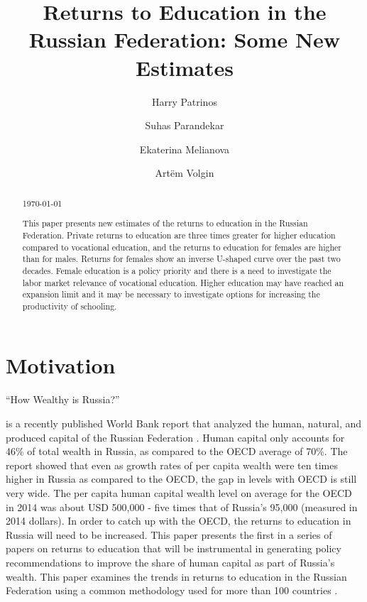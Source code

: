 \documentclass[alpha-refs]{wiley-article-01g}
\title{Returns to Education in the Russian Federation: Some New Estimates}
\author[*]{Harry Patrinos}
\author[*]{\hspace{-1em}Suhas Parandekar}
\author[*]{\hspace{-1em}Ekaterina Melianova}
\author[*]{\hspace{-1em}Art\"{e}m Volgin}
\affil[*]{Education Global Practice, Europe and Central Asia}
\begin{document}
\maketitle

\begin{abstract}
	
\vspace{.5em} \today	

\noindent This paper presents new estimates of the returns to education in 
the Russian Federation. Private returns to education are three times 
greater for higher education compared to vocational education, and the 
returns to education for females are higher than for males. Returns for 
females show an inverse U-shaped curve over the past two decades. Female 
education is a policy priority and there is a need to investigate the labor 
market relevance of vocational education. Higher education may have reached 
an expansion limit and it may be necessary to investigate options for 
increasing the productivity of schooling.

\end{abstract}




\section{Motivation}

\begin{em}``How Wealthy is Russia?''\end{em} \hspace{-0.10em}is a recently published World Bank report that analyzed the human, natural, and produced capital of the Russian Federation \parencite{Naikal2019}. Human capital only accounts for 46\% of total wealth in Russia, as compared to the OECD average of 70\%.  The report showed that even as growth rates of per capita wealth were ten times higher in Russia as compared to the OECD, the gap in levels with OECD is still very wide. The per capita human capital wealth level on average for the OECD in 2014 was about USD 500,000 - five times that of Russia's 95,000 (measured in 2014 dollars). In order to catch up with the OECD, the returns to education in Russia will need to be increased. This paper presents the first in a series of papers on returns to education that will be instrumental in generating policy recommendations to improve the share of human capital as part of Russia's wealth. This paper examines the trends in returns to education in the Russian Federation using a common methodology used for more than 100 countries \parencite{Montenegro_Patrinos2014,Psacharopoulos_Patrinos2018}.  
\end{document}

